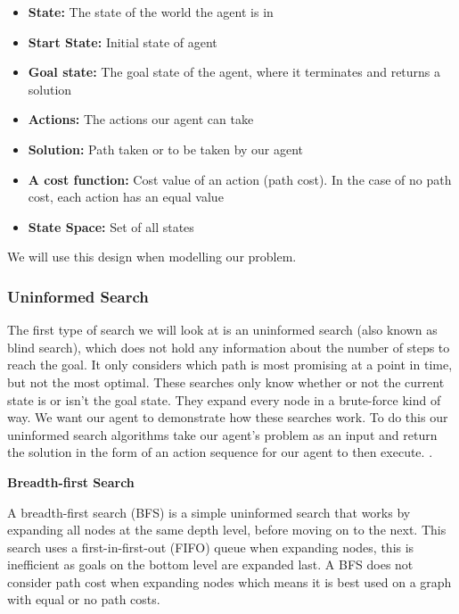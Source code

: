 \documentclass[]{final_report}
\begin{document}
\begin{itemize}
    \item \textbf{State:} The state of the world the agent is in
    \item \textbf{Start State:} Initial state of agent
    \item \textbf{Goal state:} The goal state of the agent, where it terminates and returns a solution
    \item \textbf{Actions:} The actions our agent can take
    \item \textbf{Solution:} Path taken or to be taken by our agent
    \item \textbf{A cost function:} Cost value of an action (path cost). In the case of no path cost, each action has an equal value
    \item \textbf{State Space:} Set of all states
\end{itemize}

We will use this design when modelling our problem.

\subsubsection{\Large{Uninformed Search}}\label{Uninformed search} 

The first type of search we will look at is an uninformed search (also known as blind search), which does not hold any information about the number of steps to reach the goal. It only considers which path is most promising at a point in time, but not the most optimal\cite{pathak2018comparative}. These searches only know whether or not the current state is or isn't the goal state. They expand every node in a brute-force kind of way. We want our agent to demonstrate how these searches work. To do this our uninformed search algorithms take our agent's problem as an input and return the solution in the form of an action sequence for our agent to then execute. \cite{russell2016artificial}.

\textbf{Breadth-first Search}\label{Breadth-first Search}

A breadth-first search (BFS) is a simple uninformed search that works by expanding all nodes at the same depth level, before moving on to the next. This search uses a first-in-first-out (FIFO) queue when expanding nodes, this is inefficient as goals on the bottom level are expanded last. A BFS does not consider path cost when expanding nodes which means it is best used on a graph with equal or no path costs.
\end{document}
